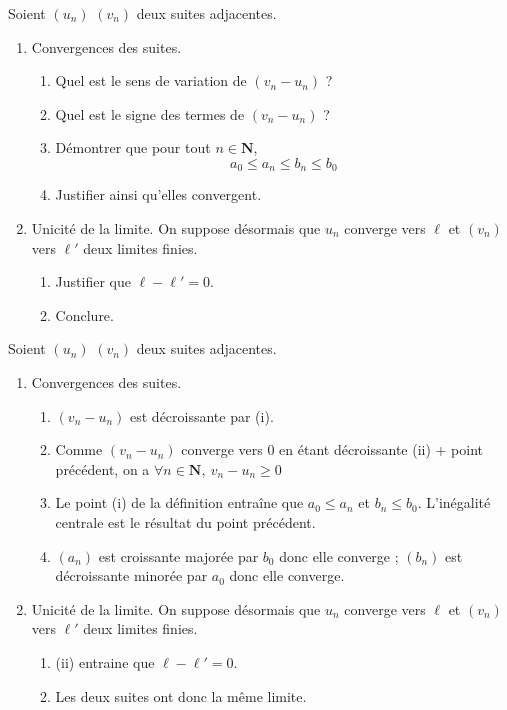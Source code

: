 \documentclass[12pt,a4paper,french]{article}
\newcommand{\N}{\mathbf{N}}
\theoremstyle{break}
\theoremstyle{plain}
\theoremstyle{nonumberplain}
\theoremstyle{nonumberbreak}
\begin{document}
\begin{question}[name=Démonstration,subtitle={suites adjacentes}]
  Soient $(u_n)$ $(v_n)$ deux suites adjacentes.
  \begin{enumerate}
    \item Convergences des suites.
      \begin{enumerate}
        \item Quel est le sens de variation de $(v_n - u_n)$ ?
        \item Quel est le signe des termes de $(v_n - u_n)$ ?
        \item Démontrer que pour tout $n\in \N$, \[ a_0 \leqslant a_n
          \leqslant b_n \leqslant b_0 \]
        \item Justifier ainsi qu'elles convergent.
      \end{enumerate}
    \item Unicité de la limite. On suppose désormais que $u_n$ converge
      vers $\ell$ et $(v_n)$ vers $\ell'$ deux limites finies.
      \begin{enumerate}
        \item Justifier que $\ell - \ell' = 0$.
        \item Conclure.
      \end{enumerate}
  \end{enumerate}
\end{question}
\begin{solution}
  Soient $(u_n)$ $(v_n)$ deux suites adjacentes.
  \begin{enumerate}
    \item Convergences des suites.
      \begin{enumerate}
        \item $(v_n - u_n)$ est décroissante par (i).
        \item Comme $(v_n - u_n)$ converge vers 0 en étant décroissante
          (ii) + point précédent, on a $\forall n \in \N,\ v_n - u_n
          \geqslant 0$
        \item Le point (i) de la définition entraîne que $a_0 \leqslant
          a_n$ et $b_n \leqslant b_0$. L'inégalité centrale est le
          résultat du point précédent.
        \item $(a_n)$ est croissante majorée par $b_0$ donc elle
          converge ; $(b_n)$ est décroissante minorée par $a_0$ donc
          elle converge.
      \end{enumerate}
    \item Unicité de la limite. On suppose désormais que $u_n$ converge
      vers $\ell$ et $(v_n)$ vers $\ell'$ deux limites finies.
      \begin{enumerate}
        \item (ii) entraine que $\ell - \ell' = 0$.
        \item Les deux suites ont donc la même limite.
      \end{enumerate}
  \end{enumerate}
\end{solution}
\end{document}
